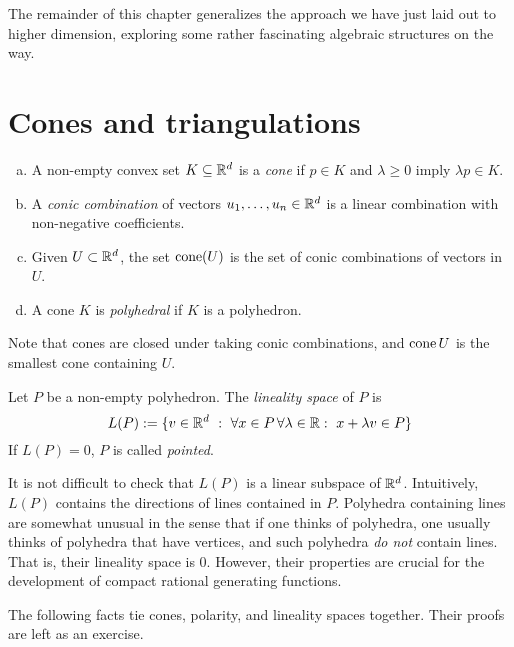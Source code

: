 The remainder of this chapter generalizes the approach we have just laid out to higher dimension,
exploring some rather fascinating algebraic structures on the way.



\section{Cones and triangulations}

\begin{definition}
  \begin{enumerate}[(a)]
    \item A non-empty convex set $K \subseteq \mathbb{R}^d$ is a \emph{cone}
      if $p \in K$ and $\lambda \geq 0$ imply $\lambda p \in K$.
  
    \item A \emph{conic combination} of vectors $u_1, \ldots, u_n \in \mathbb{R}^d$ is
      a linear combination with non-negative coefficients.
  
    \item Given $U \subset \mathbb{R}^d$, the set $\operatorname{cone}(U)$ is the set of conic combinations of vectors in $U$.
  
    \item A cone $K$ is \emph{polyhedral} if $K$ is a polyhedron.
  \end{enumerate}
\end{definition}

Note that cones are closed under taking conic combinations,
and $\operatorname{cone}{U}$ is the smallest cone containing $U$.

\begin{definition}
  Let $P$ be a non-empty polyhedron.
  The \emph{lineality space} of $P$ is
  \[
    L(P) := \{ v \in \mathbb{R}^d ~:~ \forall x\in P \,\forall \lambda \in \mathbb{R}:~ x + \lambda v \in P  \}
  \]
  If $L(P) = 0$, $P$ is called \emph{pointed}.
\end{definition}

It is not difficult to check that $L(P)$ is a linear subspace of $\mathbb{R}^d$.
Intuitively, $L(P)$ contains the directions of lines contained in $P$.
Polyhedra containing lines are somewhat unusual in the sense
that if one thinks of polyhedra, one usually thinks of polyhedra that have vertices,
and such polyhedra \emph{do not} contain lines.
That is, their lineality space is $0$.
However, their properties are crucial for the development of compact rational generating functions.

The following facts tie cones, polarity, and lineality spaces together.
Their proofs are left as an exercise.

